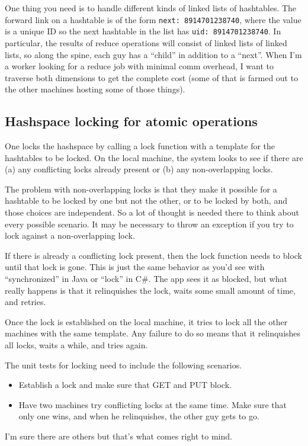 \documentclass[11pt]{article}
\begin{document}
One thing you need is to handle different kinds of linked lists of
hashtables. The forward link on a hashtable is of the form {\tt next:
  8914701238740}, where the value is a unique ID so the next hashtable
in the list has {\tt uid: 8914701238740}. In particular, the results
of reduce operations will consist of linked lists of linked lists, so
along the spine, each guy has a ``child'' in addition to a ``next''.
When I'm a worker looking for a reduce job with minimal comm overhead,
I want to traverse both dimensions to get the complete cost (some of
that is farmed out to the other machines hosting some of those
things).

\subsection{Hashspace locking for atomic operations}

One locks the hashspace by calling a lock function with a template for
the hashtables to be locked. On the local machine, the system looks to
see if there are (a) any conflicting locks already present or (b) any
non-overlapping locks.

The problem with non-overlapping locks is that they make it possible
for a hashtable to be locked by one but not the other, or to be locked
by both, and those choices are independent. So a lot of thought is
needed there to think about every possible scenario. It may be
necessary to throw an exception if you try to lock against a
non-overlapping lock.

If there is already a conflicting lock present, then the lock function
needs to block until that lock is gone. This is just the same behavior
as you'd see with ``synchronized'' in Java or ``lock'' in C\#. The app
sees it as blocked, but what really happens is that it relinquishes
the lock, waits some small amount of time, and retries.

Once the lock is established on the local machine, it tries to lock
all the other machines with the same template. Any failure to do so
means that it relinquishes all locks, waits a while, and tries again.

The unit tests for locking need to include the following scenarios.
\begin{itemize}
\item Establish a lock and make sure that GET and PUT block.
\item Have two machines try conflicting locks at the same time. Make
  sure that only one wins, and when he relinquishes, the other guy
  gets to go.
\end{itemize}
I'm sure there are others but that's what comes right to mind.
\end{document}
